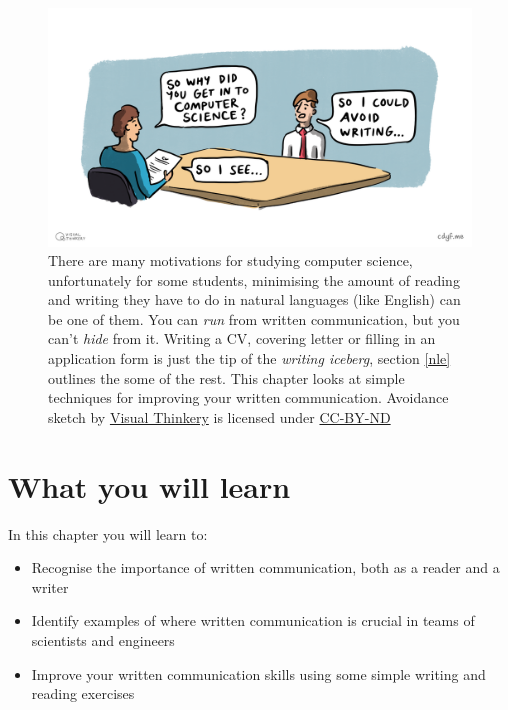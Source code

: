 \documentclass[
]{book}
\providecommand{\tightlist}{%
  \setlength{\itemsep}{0pt}\setlength{\parskip}{0pt}}
\begin{document}
\begin{figure}

{\centering \includegraphics[width=1\linewidth]{images/Avoiding writing} 

}

\caption{There are many motivations for studying computer science, unfortunately for some students, minimising the amount of reading and writing they have to do in natural languages (like English) can be one of them. You can \emph{run} from written communication, but you can't \emph{hide} from it. Writing a CV, covering letter or filling in an application form is just the tip of the \emph{writing iceberg}, section \ref{nle} outlines the some of the rest. This chapter looks at simple techniques for improving your written communication. Avoidance sketch by \href{https://visualthinkery.com}{Visual Thinkery} is licensed under \href{https://creativecommons.org/licenses/by-nd/4.0/}{CC-BY-ND}}\label{fig:no-writing-fig}
\end{figure}



\hypertarget{what-you-will-learn}{%
\section{What you will learn}\label{what-you-will-learn}}

In this chapter you will learn to:

\begin{itemize}
\tightlist
\item
  Recognise the importance of written communication, both as a reader and a writer
\item
  Identify examples of where written communication is crucial in teams of scientists and engineers
\item
  Improve your written communication skills using some simple writing and reading exercises
\end{itemize}
\end{document}
